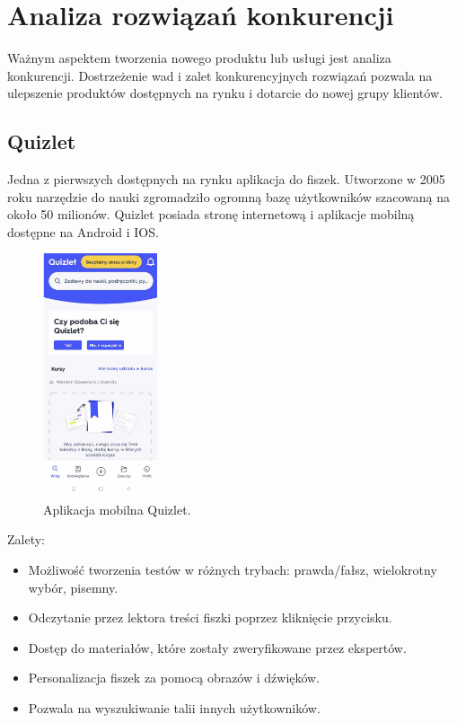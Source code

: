 \section{Analiza rozwiązań konkurencji}

Ważnym aspektem tworzenia nowego produktu lub usługi jest analiza konkurencji. Dostrzeżenie wad i zalet konkurencyjnych rozwiązań pozwala na ulepszenie produktów dostępnych na rynku i dotarcie do nowej grupy klientów.

\subsection{Quizlet}


Jedna z pierwszych dostępnych na rynku aplikacja do fiszek. Utworzone w 2005 roku narzędzie do nauki zgromadziło ogromną bazę użytkowników szacowaną na około 50 milionów. Quizlet posiada stronę internetową i aplikacje mobilną dostępne na Android i IOS.

\begin{figure}[H]
    \centering
    \includegraphics[width=0.3\textwidth]{chapters/chapter_3/quizlet}
    \caption{Aplikacja mobilna Quizlet.}
    \label{img:quizlet}
\end{figure}

Zalety:
\begin{itemize}
    \item Możliwość tworzenia testów w różnych trybach: prawda/fałsz, wielokrotny wybór, pisemny.
    \item Odczytanie przez lektora treści fiszki poprzez kliknięcie przycisku.
    \item Dostęp do materiałów, które zostały zweryfikowane przez ekspertów.
    \item Personalizacja fiszek za pomocą obrazów i dźwięków.
    \item Pozwala na wyszukiwanie talii innych użytkowników.
\end{itemize}

